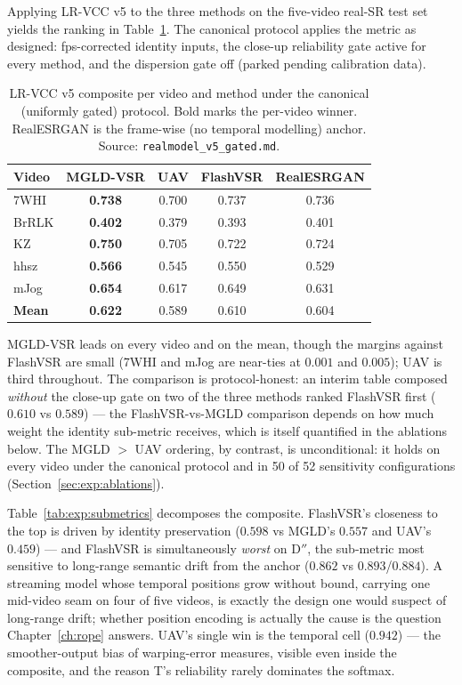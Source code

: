 Applying LR-VCC v5 to the three methods on the five-video real-SR test set yields the
ranking in Table~\ref{tab:exp:threemethod}. The canonical protocol applies the metric
as designed: fps-corrected identity inputs, the close-up reliability gate active for
every method, and the dispersion gate off (parked pending calibration data).

\begin{table}[h]
\centering
\caption{LR-VCC v5 composite per video and method under the canonical (uniformly
gated) protocol. Bold marks the per-video winner. RealESRGAN is the frame-wise
(no temporal modelling) anchor. Source: \texttt{realmodel\_v5\_gated.md}.}
\label{tab:exp:threemethod}
\begin{tabular}{lcccc}
\hline
\textbf{Video} & \textbf{MGLD-VSR} & \textbf{UAV} & \textbf{FlashVSR} & \textbf{RealESRGAN} \\
\hline
7WHI & \textbf{0.738} & 0.700 & 0.737 & 0.736 \\
BrRLK & \textbf{0.402} & 0.379 & 0.393 & 0.401 \\
KZ & \textbf{0.750} & 0.705 & 0.722 & 0.724 \\
hhsz & \textbf{0.566} & 0.545 & 0.550 & 0.529 \\
mJog & \textbf{0.654} & 0.617 & 0.649 & 0.631 \\
\hline
\textbf{Mean} & \textbf{0.622} & 0.589 & 0.610 & 0.604 \\
\hline
\end{tabular}
\end{table}

MGLD-VSR leads on every video and on the mean, though the margins against
FlashVSR are small (7WHI and mJog are near-ties at $0.001$ and $0.005$); UAV
is third throughout. The comparison is protocol-honest: an interim table
composed \emph{without} the close-up gate on two of the three methods ranked
FlashVSR first ($0.610$ vs $0.589$) --- the FlashVSR-vs-MGLD comparison
depends on how much weight the identity sub-metric receives, which is itself
quantified in the ablations below. The MGLD $>$ UAV ordering, by contrast, is
unconditional: it holds on every video under the canonical protocol and in 50
of 52 sensitivity configurations (Section~\ref{sec:exp:ablations}).

Table~\ref{tab:exp:submetrics} decomposes the composite. FlashVSR's
closeness to the top is driven by identity preservation ($0.598$ vs MGLD's
$0.557$ and UAV's $0.459$) --- and FlashVSR is simultaneously \emph{worst} on
D$''$, the sub-metric most sensitive to long-range semantic drift from the
anchor ($0.862$ vs $0.893$/$0.884$). A streaming model whose temporal
positions grow without bound, carrying one mid-video seam on four of five
videos, is exactly the design one would suspect of long-range drift; whether
position encoding is actually the cause is the question
Chapter~\ref{ch:rope} answers. UAV's single win is the temporal cell
($0.942$) --- the smoother-output bias of warping-error measures, visible
even inside the composite, and the reason T's reliability rarely dominates
the softmax.

